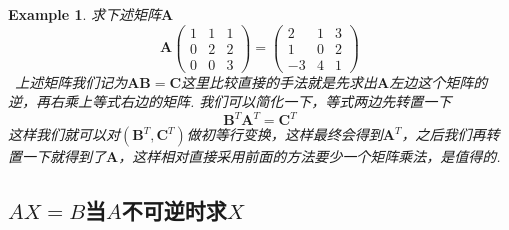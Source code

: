 \documentclass{article}
\newtheorem{example}[theorem]{Example}
\newcommand{\hints}{{\color{blue} \text{hints}}}
\newcommand{\mbf}[1]{\bm{#1}}
\begin{document}
\begin{example}
\rm 求下述矩阵$\mbf{A}$
$$
\mbf{A}\begin{pmatrix}
1 & 1 & 1 \\
0 & 2 & 2 \\
0 & 0 & 3
\end{pmatrix} = 
\begin{pmatrix}
2 & 1 & 3 \\
1 & 0 & 2 \\
-3 & 4 & 1
\end{pmatrix}
$$
\hints\  上述矩阵我们记为$\mbf{AB} = \mbf{C}$这里比较直接的手法就是先求出$\mbf{A}$左边这个矩阵的逆，再右乘上等式右边的矩阵. 我们可以简化一下，等式两边先转置一下
$$
\mbf{B}^T\mbf{A}^T = \mbf{C}^T
$$
这样我们就可以对$(\mbf{B}^{T},\mbf{C}^T)$做初等行变换，这样最终会得到$\mbf{A}^T$，之后我们再转置一下就得到了$\mbf{A}$，这样相对直接采用前面的方法要少一个矩阵乘法，是值得的. 
\end{example}


\subsection{$AX=B$当$A$不可逆时求$X$}
\end{document}
